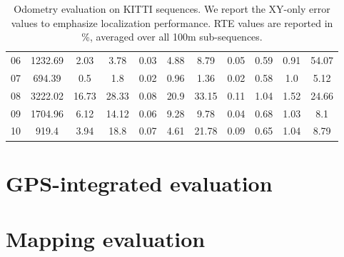 \begin{table}[h]
\begin{tabular}{c|c|ccc|ccc|ccc}
        06            & 1232.69         & 2.03                              & 3.78                                & 0.03                                         & 4.88        & 8.79          & 0.05          & 0.59        & 0.91          & 54.07         \\
        07            & 694.39          & 0.5                               & 1.8                                 & 0.02                                         & 0.96        & 1.36          & 0.02          & 0.58        & 1.0           & 5.12          \\
        08            & 3222.02         & 16.73                             & 28.33                               & 0.08                                         & 20.9        & 33.15         & 0.11          & 1.04        & 1.52          & 24.66         \\
        09            & 1704.96         & 6.12                              & 14.12                               & 0.06                                         & 9.28        & 9.78          & 0.04          & 0.68        & 1.03          & 8.1           \\
        10            & 919.4           & 3.94                              & 18.8                                & 0.07                                         & 4.61        & 21.78         & 0.09          & 0.65        & 1.04          & 8.79          \\
        \hline
    \end{tabular}
    \caption{Odometry evaluation on KITTI sequences. We report the XY-only error values to emphasize localization performance. RTE values are reported in \%, averaged over all 100m sub-sequences.}
    \label{tab:odom-kitti}
\end{table}

\section{GPS-integrated evaluation}



\section{Mapping evaluation}


